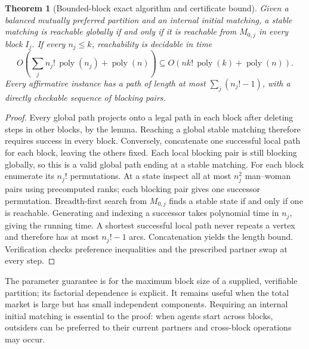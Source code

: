 \documentclass[11pt,a4paper]{article}
\newtheorem{theorem}{Theorem}
\begin{document}
\begin{theorem}[Bounded-block exact algorithm and certificate bound]
Given a balanced mutually preferred partition and an internal initial matching, a stable matching is reachable globally if and only if it is reachable from $M_{0,j}$ in every block $I_j$. If every $n_j\leq k$, reachability is decidable in time
\[
 O\left(\sum_j n_j!\,\operatorname{poly}(n_j)+\operatorname{poly}(n)\right)
 \subseteq O\left(n k!\,\operatorname{poly}(k)+\operatorname{poly}(n)\right).
\]
Every affirmative instance has a path of length at most $\sum_j(n_j!-1)$, with a directly checkable sequence of blocking pairs.
\end{theorem}
\begin{proof}
Every global path projects onto a legal path in each block after deleting steps in other blocks, by the lemma. Reaching a global stable matching therefore requires success in every block. Conversely, concatenate one successful local path for each block, leaving the others fixed. Each local blocking pair is still blocking globally, so this is a valid global path ending at a stable matching.
For each block enumerate its $n_j!$ permutations. At a state inspect all at most $n_j^2$ man--woman pairs using precomputed ranks; each blocking pair gives one successor permutation. Breadth-first search from $M_{0,j}$ finds a stable state if and only if one is reachable. Generating and indexing a successor takes polynomial time in $n_j$, giving the running time. A shortest successful local path never repeats a vertex and therefore has at most $n_j!-1$ arcs. Concatenation yields the length bound. Verification checks preference inequalities and the prescribed partner swap at every step.
\end{proof}
The parameter guarantee is for the maximum block size of a supplied, verifiable partition; its factorial dependence is explicit. It remains useful when the total market is large but has small independent components. Requiring an internal initial matching is essential to the proof: when agents start across blocks, outsiders can be preferred to their current partners and cross-block operations may occur.
\end{document}
